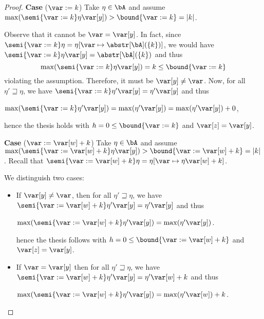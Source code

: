 \begin{proof}
  \medskip
  
  \noindent
  \textbf{Case} (\(\var := k\))
  Take \(\eta \in \bA\) and assume
  \(\max(\semi{\var := k}\eta \var[y]) > \bound{\var := k} = |k|\).

  Observe that it cannot be \(\var = \var[y]\). In fact, since
  \(\semi{\var := k}\eta = \eta[\var \mapsto \abstr[\bA](\{k\})]\), we
  would have \(\semi{\var := k}\eta \var[y] = \abstr[\bA](\{k\})\) and
  thus 
  \begin{equation*}
    \max(\semi{\var := k}\eta \var[y]) = k  \leq \bound{\var := k}
  \end{equation*}
  violating the assumption.
  Therefore, it must be \(\var[y] \neq \var\). Now, for all
  \(\eta' \sqsupseteq \eta\), we have
  \(\semi{\var := k}\eta' \var[y] = \eta' \var[y]\) and thus
  \begin{center}
    \(\max(\semi{\var := k}\eta' \var[y]) = \max(\eta' \var[y]) =
    \max(\eta' \var[y]) + 0\),
  \end{center}
  hence the thesis holds with \(h =0 \leq \bound{\var :=k}\) and \(\var[z] = \var[y]\).
  
  
  \medskip
  
  \noindent
  \textbf{Case} (\(\var := \var[w] + k\))
  Take \(\eta \in \bA\) and assume
  \(\max(\semi{\var := \var[w] + k}\eta \var[y]) > \bound{\var :=
    \var[w] + k} = |k|\).
  Recall that
  \(\semi{\var := \var[w] + k}\eta = \eta[\var \mapsto \eta \var[w] + k]\).
  
  We distinguish two cases:
  \begin{itemize}
    
  \item If \(\var[y] \neq \var\), then for all \(\eta' \sqsupseteq \eta\), we have
    \(\semi{\var := \var[w] + k}\eta' \var[y] = \eta' \var[y]\) and thus
    \begin{center}
      \(\max(\semi{\var := \var[w] + k}\eta' \var[y]) = \max(\eta' \var[y])\).
    \end{center}
    hence the thesis follows with
    \(h =0 \leq \bound{\var := \var[w] + k}\) and \(\var[z] = \var[y]\).
    
  \item 
    If \(\var = \var[y]\) then  for all \(\eta' \sqsupseteq \eta\), we have
    \(\semi{\var := \var[w] + k}\eta' \var[y] = \eta' \var[w] +
    k\) and thus
    \begin{center}
      \(\max(\semi{\var := \var[w] + k}\eta' \var[y]) = \max(\eta' \var[w]) +
      k\).
    \end{center}
    

\end{itemize}
\end{proof}
